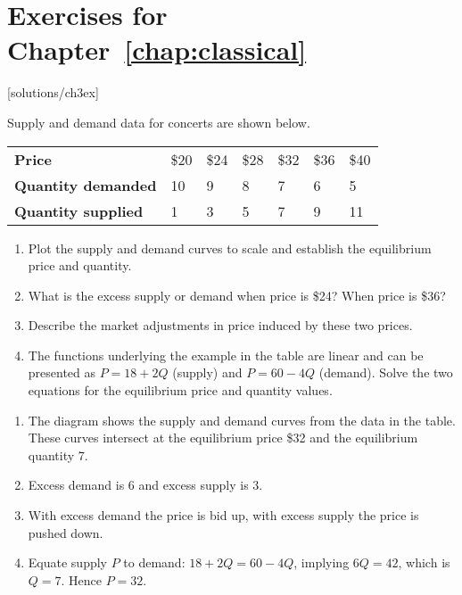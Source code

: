 \newpage
\section*{Exercises for Chapter~\ref{chap:classical}}

\begin{enumialphparenastyle}

[solutions/ch3ex]

\begin{ex}\label{ex:ch3ex1}
Supply and demand data for concerts are shown below.
\begin{center}
\begin{tabu} to \linewidth {|X[5,c]X[0.5,c]X[0.5,c]X[0.5,c]X[0.5,c]X[0.5,c]X[0.5,c]|}	\hline
{}	\textbf{Price}				&	\$20	&	\$24	&	\$28	&	\$32	&	\$36	&	\$40	\\
						\textbf{Quantity demanded}	&	10		&	9		&	8		&	7		&	6		&	5		\\
	\textbf{Quantity supplied}	&	1		&	3		&	5		&	7		&	9		&	11		\\	\hline
\end{tabu}
\end{center}
\begin{enumerate}
	\item	Plot the supply and demand curves to scale and establish the equilibrium price and quantity.
	\item	What is the excess supply or demand when price is \$24? When price is \$36?
	\item	Describe the market adjustments in price induced by these two prices.
	\item	The functions underlying the example in the table are linear and can be presented as $P=18+2Q$ (supply) and $P=60-4Q$ (demand). Solve the two equations for the equilibrium price and quantity values.
\end{enumerate}
\begin{sol}
\begin{enumerate}
	\item	The diagram shows the supply and demand curves from the data in the table. These curves intersect at the equilibrium price \$32 and the equilibrium quantity 7.
	\item	Excess demand is 6 and excess supply is 3.
	\item	With excess demand the price is bid up, with excess supply the price is pushed down.
	\item	Equate supply $P$ to demand: $18+2Q=60-4Q$, implying $6Q=42$, which is $Q=7$. Hence $P=32$.

\end{enumerate}
\end{sol}
\end{ex}
\end{enumialphparenastyle}
